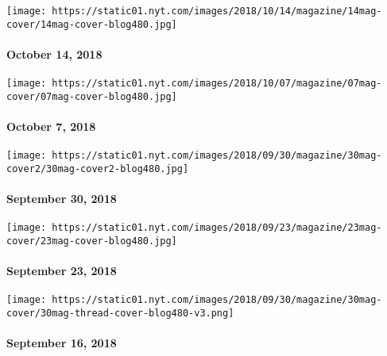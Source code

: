 \href{https://www.nytimes.com/issue/magazine/2018/10/12/the-101418-issue}{}

\texttt{[image: https://static01.nyt.com/images/2018/10/14/magazine/14mag-cover/14mag-cover-blog480.jpg]}

\hypertarget{october-14-2018}{%
\paragraph{October 14, 2018}\label{october-14-2018}}

\href{https://www.nytimes.com/issue/magazine/2018/10/08/the-100718-issue}{}

\texttt{[image: https://static01.nyt.com/images/2018/10/07/magazine/07mag-cover/07mag-cover-blog480.jpg]}

\hypertarget{october-7-2018}{%
\paragraph{October 7, 2018}\label{october-7-2018}}

\href{https://www.nytimes.com/issue/magazine/2018/09/28/the-93018-issue}{}

\texttt{[image: https://static01.nyt.com/images/2018/09/30/magazine/30mag-cover2/30mag-cover2-blog480.jpg]}

\hypertarget{september-30-2018}{%
\paragraph{September 30, 2018}\label{september-30-2018}}

\href{https://www.nytimes.com/interactive/2018/09/21/magazine/voyages-travel-sounds-from-the-world.html}{}

\texttt{[image: https://static01.nyt.com/images/2018/09/23/magazine/23mag-cover/23mag-cover-blog480.jpg]}

\hypertarget{september-23-2018}{%
\paragraph{September 23, 2018}\label{september-23-2018}}

\href{https://www.nytimes.com/issue/magazine/2018/09/24/the-91618-issue}{}

\texttt{[image: https://static01.nyt.com/images/2018/09/30/magazine/30mag-cover/30mag-thread-cover-blog480-v3.png]}

\hypertarget{september-16-2018}{%
\paragraph{September 16, 2018}\label{september-16-2018}}

